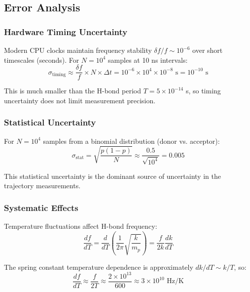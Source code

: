 \documentclass[twocolumn,10pt]{article}
\theoremstyle{remark}
\begin{document}
\subsection{Error Analysis}

\subsubsection{Hardware Timing Uncertainty}

Modern CPU clocks maintain frequency stability $\delta f/f \sim 10^{-6}$ over short timescales (seconds). For $N = 10^4$ samples at 10 ns intervals:
\begin{equation}
\sigma_{\mathrm{timing}} \approx \frac{\delta f}{f} \times N \times \Delta t = 10^{-6} \times 10^4 \times 10^{-8} \text{ s} = 10^{-10} \text{ s}
\end{equation}

This is much smaller than the H-bond period $T = 5 \times 10^{-14}$ s, so timing uncertainty does not limit measurement precision.

\subsubsection{Statistical Uncertainty}

For $N = 10^4$ samples from a binomial distribution (donor vs. acceptor):
\begin{equation}
\sigma_{\mathrm{stat}} = \sqrt{\frac{p(1-p)}{N}} \approx \frac{0.5}{\sqrt{10^4}} = 0.005
\end{equation}

This statistical uncertainty is the dominant source of uncertainty in the trajectory measurements.

\subsubsection{Systematic Effects}

Temperature fluctuations affect H-bond frequency:
\begin{equation}
\frac{df}{dT} = \frac{d}{dT}\left(\frac{1}{2\pi}\sqrt{\frac{k}{m_p}}\right) = \frac{f}{2k}\frac{dk}{dT}
\end{equation}

The spring constant temperature dependence is approximately $dk/dT \sim k/T$, so:
\begin{equation}
\frac{df}{dT} \approx \frac{f}{2T} \approx \frac{2 \times 10^{13}}{600} \approx 3 \times 10^{10} \text{ Hz/K}
\end{equation}
\end{document}

